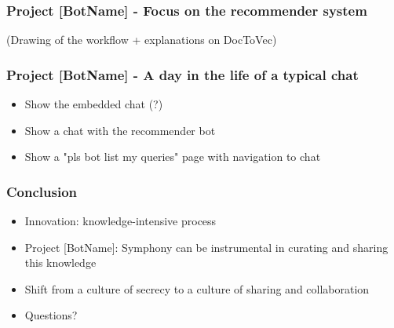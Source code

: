 \documentclass{beamer}
\begin{document}
\begin{frame}
\frametitle{Project [BotName] - Focus on the recommender system}

(Drawing of the workflow + explanations on DocToVec)

\end{frame}

\begin{frame}
\frametitle{Project [BotName] - A day in the life of a typical chat}
\begin{itemize}
\item Show the embedded chat (?)
\item Show a chat with the recommender bot
\item Show a "pls bot list my queries" page with navigation to chat
\end{itemize}
\end{frame}

\begin{frame}
\frametitle{Conclusion}
\begin{itemize}
\item Innovation: knowledge-intensive process
\item Project [BotName]: Symphony can be instrumental in curating and sharing this knowledge
\item Shift from a culture of secrecy to a culture of sharing and collaboration
\item Questions?
\end{itemize}
\end{frame}
\end{document}
